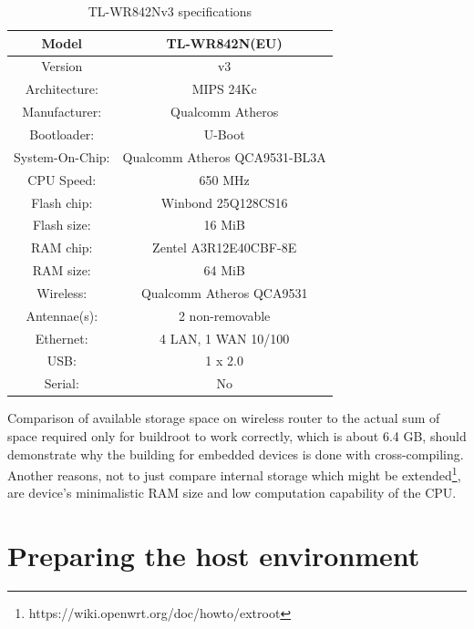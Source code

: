 \begin{table}[H]
\centering
\label{routerspec}
\begin{tabular}{c|c}
\hline
Model           &   TL-WR842N(EU)                   \\ \hline
Version         &   v3                              \\ \hline
Architecture:   &   MIPS 24Kc                       \\ \hline
Manufacturer:   &   Qualcomm Atheros                \\ \hline
Bootloader:     &   U-Boot                          \\ \hline
System-On-Chip: &   Qualcomm Atheros QCA9531-BL3A   \\ \hline
CPU Speed:      &   650 MHz                         \\ \hline
Flash chip:     &   Winbond 25Q128CS16              \\ \hline
Flash size:     &   16 MiB                          \\ \hline
RAM chip:       &   Zentel A3R12E40CBF-8E           \\ \hline
RAM size:       &   64 MiB                          \\ \hline
Wireless:       &   Qualcomm Atheros QCA9531        \\ \hline
Antennae(s):    &   2 non-removable                 \\ \hline
Ethernet:       &   4 LAN, 1 WAN 10/100             \\ \hline
USB:            &   1 x 2.0                         \\ \hline
Serial:         &   No                              \\ \hline
\end{tabular}
\caption{TL-WR842Nv3 specifications}
\end{table}

Comparison of available storage space on wireless router to the actual sum of space required only for buildroot to work correctly, which is about 6.4 GB, should demonstrate why the building for embedded devices is done with cross-compiling.
Another reasons, not to just compare internal storage which might be extended\footnote{https://wiki.openwrt.org/doc/howto/extroot}, are device's minimalistic RAM size and low computation capability of the CPU.



\section{Preparing the host environment}

